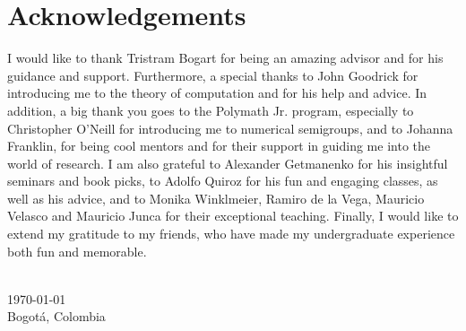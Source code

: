 \chapter*{Acknowledgements}


I would like to thank Tristram Bogart for being an amazing advisor and for his guidance and support. Furthermore, a special thanks to John Goodrick for introducing me to the theory of computation and for his help and advice. In addition, a big thank you goes to the Polymath Jr. program, especially to Christopher O'Neill for introducing me to numerical semigroups, and to Johanna Franklin, for being cool mentors and for their support in guiding me into the world of research. I am also grateful to Alexander Getmanenko for his insightful seminars and book picks, to Adolfo Quiroz for his fun and engaging classes, as well as his advice, and to Monika Winklmeier, Ramiro de la Vega, Mauricio Velasco and Mauricio Junca for their exceptional teaching. Finally, I would like to extend my gratitude to my friends, who have made my undergraduate experience both fun and memorable. \par


{
\makeatletter
\vspace{1cm}
\raggedleft
\@author{}\\
\today{}\\
Bogotá, Colombia\\
\raggedright
\makeatother
}
